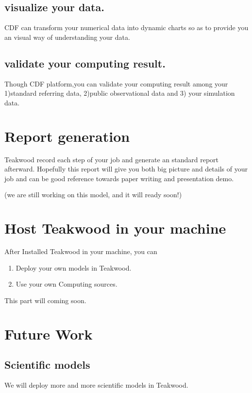 \documentclass[letterpaper,10pt,openany, oneside]{sphinxmanual}
\begin{document}
\section{visualize your data.}
\label{observation:visualize-your-data}
CDF can transform your numerical data into dynamic charts so as to provide you an visual way of understanding your data.


\section{validate your computing result.}
\label{observation:validate-your-computing-result}
Though CDF platform,you can validate your computing result among your 1)standard referring data,
2)public observational data and 3) your simulation data.


\chapter{Report generation}
\label{report:report-generation}\label{report::doc}
Teakwood record each step of your job and generate an standard report afterward.
Hopefully this report will give you both big picture and details of your job and can be good reference towards paper
writing and presentation demo.

(we are still working on this model, and it will ready soon!)


\chapter{Host Teakwood in your machine}
\label{installation:host-teakwood-in-your-machine}\label{installation::doc}
After Installed Teakwood in your machine, you can
\begin{enumerate}
\item {} 
Deploy your own models in Teakwood.

\item {} 
Use your own Computing sources.

\end{enumerate}

This part will coming soon.


\chapter{Future Work}
\label{futurework:future-work}\label{futurework::doc}

\section{Scientific models}
\label{futurework:scientific-models}
We will deploy more and more scientific models in Teakwood.
\end{document}
